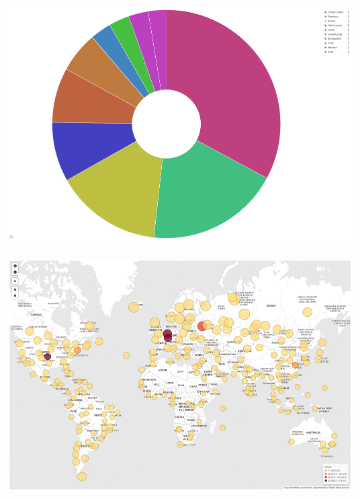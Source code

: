 \begin{figure}
    \centering

    \begin{subfigure}[b]{0.49\textwidth}
        \centering
        \includegraphics[width=\textwidth]{figures/tpot-attacks-country.png}
        \caption{}
        \label{fig:tpot-overview-map}
    \end{subfigure}
    \hfill
    \begin{subfigure}[b]{0.49\textwidth}
        \centering
        \includegraphics[width=\textwidth]{figures/tpot-overview-map.png}
        \caption{}
        \label{fig:tpot-attack-country}
    \end{subfigure}
    \caption[]{}
    \label{fig:attack-distribution}
\end{figure}

